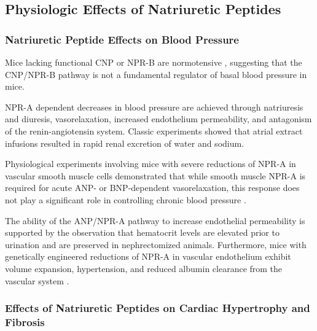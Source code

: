 \documentclass[14pt,a4paper,onecolumn]{extarticle}
\begin{document}
\subsection{Physiologic Effects of Natriuretic Peptides}


\subsubsection{Natriuretic Peptide Effects on Blood Pressure}

Mice lacking functional CNP or NPR-B are normotensive \citep{Chusho2001} \citep{Tamura2004}, suggesting that the CNP/NPR-B pathway is not a fundamental regulator of basal blood pressure in mice.

NPR-A dependent decreases in blood pressure are achieved through natriuresis and diuresis, vasorelaxation, increased endothelium permeability, and antagonism of the renin-angiotensin system. Classic experiments showed that atrial extract infusions resulted in rapid renal excretion of water and sodium.

Physiological experiments involving mice with severe reductions of NPR-A in vascular smooth muscle cells demonstrated that while smooth muscle NPR-A is required for acute ANP- or BNP-dependent vasorelaxation, this response does not play a significant role in controlling chronic blood pressure \citep{Holtwick2002}.

The ability of the ANP/NPR-A pathway to increase  endothelial permeability is supported by the observation that hematocrit levels are elevated prior to urination and are preserved in nephrectomized animals.  Furthermore, mice with genetically engineered reductions of NPR-A in vascular endothelium exhibit volume expansion, hypertension, and reduced albumin clearance from the vascular system \citep{Sabrane2005}.

\subsubsection{Effects of Natriuretic Peptides on Cardiac Hypertrophy and Fibrosis}
\end{document}
